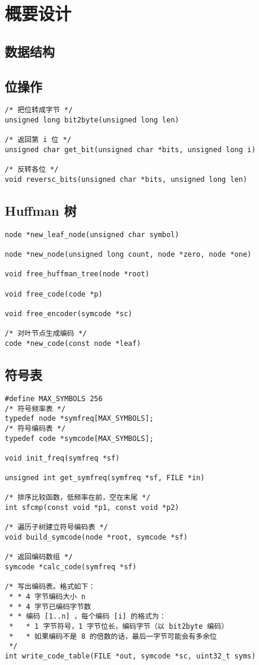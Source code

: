 \section{概要设计}


\subsection{数据结构}

\subsection{位操作}

\begin{verbatim}
/* 把位转成字节 */
unsigned long bit2byte(unsigned long len)

/* 返回第 i 位 */
unsigned char get_bit(unsigned char *bits, unsigned long i)

/* 反转各位 */
void reversc_bits(unsigned char *bits, unsigned long len)
\end{verbatim}

\subsection{Huffman 树}

\begin{verbatim}
node *new_leaf_node(unsigned char symbol)

node *new_node(unsigned long count, node *zero, node *one)

void free_huffman_tree(node *root)

void free_code(code *p)

void free_encoder(symcode *sc)

/* 对叶节点生成编码 */
code *new_code(const node *leaf)
\end{verbatim}

\subsection{符号表}

\begin{verbatim}
#define MAX_SYMBOLS 256
/* 符号频率表 */
typedef node *symfreq[MAX_SYMBOLS];
/* 符号编码表 */
typedef code *symcode[MAX_SYMBOLS];

void init_freq(symfreq *sf)

unsigned int get_symfreq(symfreq *sf, FILE *in)

/* 排序比较函数，低频率在前，空在末尾 */
int sfcmp(const void *p1, const void *p2)

/* 遍历子树建立符号编码表 */
void build_symcode(node *root, symcode *sf)

/* 返回编码数组 */
symcode *calc_code(symfreq *sf)

/* 写出编码表。格式如下：
 * * 4 字节编码大小 n
 * * 4 字节已编码字节数
 * * 编码 [1..n] ，每个编码 [i] 的格式为：
 *   * 1 字节符号，1 字节位长，编码字节（以 bit2byte 编码）
 *   * 如果编码不是 8 的倍数的话，最后一字节可能会有多余位
 */
int write_code_table(FILE *out, symcode *sc, uint32_t syms)
\end{verbatim}

